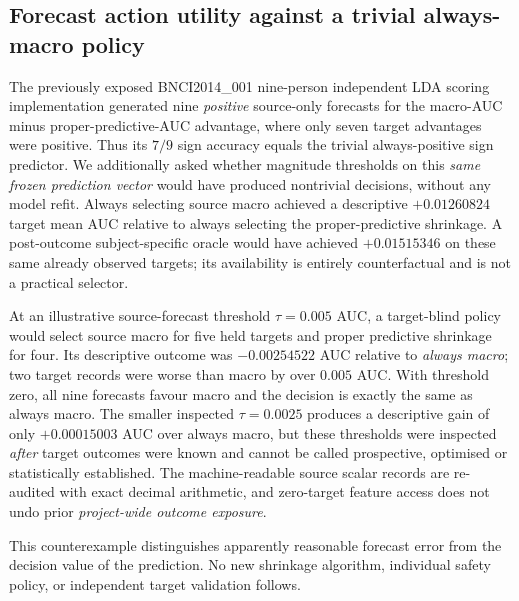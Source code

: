 \subsection{Forecast action utility against a trivial always-macro policy}
\label{sec:p1-exposed-action-null}
The previously exposed BNCI2014\_001 nine-person
independent LDA scoring implementation generated
nine \emph{positive} source-only forecasts for the
macro-AUC minus proper-predictive-AUC advantage,
where only seven target advantages were positive.
Thus its $7/9$ sign accuracy equals the trivial
always-positive sign predictor. We additionally
asked whether magnitude thresholds on this \emph{same
frozen prediction vector} would have produced
nontrivial decisions, without any model refit.
Always selecting source macro achieved a descriptive
$+0.01260824$ target mean AUC relative to always
selecting the proper-predictive shrinkage. A
post-outcome subject-specific oracle would have
achieved $+0.01515346$ on these same already
observed targets; its availability is entirely
counterfactual and is not a practical selector.

At an illustrative source-forecast threshold
$\tau=0.005$ AUC, a target-blind policy would
select source macro for five held targets
and proper predictive shrinkage for four.
Its descriptive outcome was $-0.00254522$
AUC relative to \emph{always macro};
two target records were worse than macro
by over $0.005$ AUC. With threshold zero,
all nine forecasts favour macro and the
decision is exactly the same as always macro.
The smaller inspected $\tau=0.0025$ produces
a descriptive gain of only $+0.00015003$
AUC over always macro, but these thresholds
were inspected \emph{after} target outcomes
were known and cannot be called prospective,
optimised or statistically established.
The machine-readable source scalar records
are re-audited with exact decimal arithmetic,
and zero-target feature access does not undo
prior \emph{project-wide outcome exposure}.

This counterexample distinguishes apparently
reasonable forecast error from the decision
value of the prediction. No new shrinkage
algorithm, individual safety policy, or
independent target validation follows.
